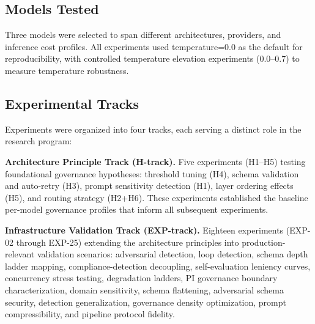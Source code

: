 \documentclass[11pt,a4paper]{article}
\begin{document}
\subsection{Models Tested}

Three models were selected to span different architectures, providers, and inference cost profiles. All experiments used temperature=0.0 as the default for reproducibility, with controlled temperature elevation experiments (0.0--0.7) to measure temperature robustness.

\begin{table}[htbp]\centering\caption{Model Matrix}\small
{}
\end{table}

\subsection{Experimental Tracks}

Experiments were organized into four tracks, each serving a distinct role in the research program:

\textbf{Architecture Principle Track (H-track).} Five experiments (H1--H5) testing foundational governance hypotheses: threshold tuning (H4), schema validation and auto-retry (H3), prompt sensitivity detection (H1), layer ordering effects (H5), and routing strategy (H2+H6). These experiments established the baseline per-model governance profiles that inform all subsequent experiments.

\textbf{Infrastructure Validation Track (EXP-track).} Eighteen experiments (EXP-02 through EXP-25) extending the architecture principles into production-relevant validation scenarios: adversarial detection, loop detection, schema depth ladder mapping, compliance-detection decoupling, self-evaluation leniency curves, concurrency stress testing, degradation ladders, PI governance boundary characterization, domain sensitivity, schema flattening, adversarial schema security, detection generalization, governance density optimization, prompt compressibility, and pipeline protocol fidelity.
\end{document}
